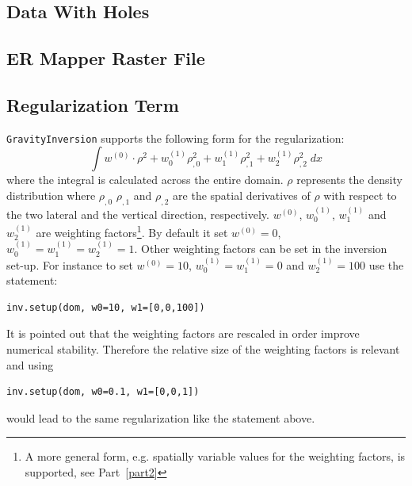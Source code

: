 \subsection{Data With Holes}\label{SEC:P1:GRAV:REMARK:DATAHOLES}


\subsection{ER Mapper Raster File}\label{SEC:P1:GRAV:REMARK:ERMAPPER}

\subsection{Regularization Term}\label{SEC:P1:GRAV:REMARK:REG}
\verb|GravityInversion| supports the following form for the regularization:
\begin{equation}
\int w^{(0)} \cdot \rho^2 + w^{(1)}_0  \rho_{,0}^2 +  w^{(1)}_1  \rho_{,1}^2 +  w^{(1)}_2  \rho_{,2}^2\; dx   
\end{equation}
where the integral is calculated across the entire domain. $\rho$ represents the density distribution 
where $\rho_{,0}$ $\rho_{,1}$ and $\rho_{,2}$ are the spatial derivatives of $\rho$ with respect to the 
two lateral and the vertical direction, respectively.  
$w^{(0)}$, $w^{(1)}_0$, $w^{(1)}_1$ and $w^{(1)}_2$ are weighting factors\footnote{A more general form, e.g. spatially variable values
for the weighting factors, is supported, see Part~\ref{part2}}. By default it set
$w^{(0)}=0$, $w^{(1)}_0=w^{(1)}_1=w^{(1)}_2=1$. Other weighting factors can be set in the inversion set-up. For instance to
set $w^{(0)}=10$,
$w^{(1)}_0=w^{(1)}_1=0$ and $w^{(1)}_2=100$ use the statement:
\begin{verbatim}
inv.setup(dom, w0=10, w1=[0,0,100])
\end{verbatim}
It is pointed out that the weighting factors are rescaled in order improve numerical stability. Therefore the relative size of
the weighting factors is relevant and using  
\begin{verbatim}
inv.setup(dom, w0=0.1, w1=[0,0,1])
\end{verbatim}
would lead to the same regularization like the statement above.




